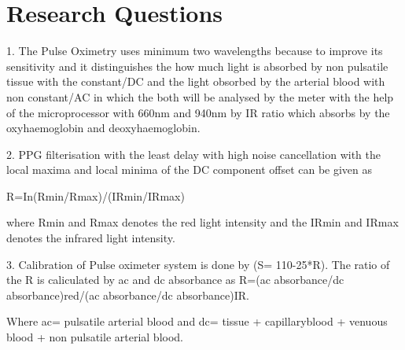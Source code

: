 





\section{Research Questions}

1. The Pulse Oximetry uses minimum two wavelengths because to improve its sensitivity and it distinguishes the how much light is absorbed by non pulsatile tissue with the constant/DC and the light obsorbed by the arterial blood with non constant/AC in which the both will be analysed by the meter with the help of the microprocessor with 660nm and 940nm by IR ratio which absorbs by the oxyhaemoglobin and deoxyhaemoglobin.\cite{webster1997design}

2. PPG filterisation with the least delay with high noise cancellation with the local maxima and local minima of the DC component offset can be given as \cite{1997 websterdesign}
\begin{center}
R=In(Rmin/Rmax)/(IRmin/IRmax)
\end{center}
where Rmin and Rmax denotes the red light intensity and the IRmin and IRmax denotes the infrared light intensity.

3. Calibration of Pulse oximeter system is done by (S= 110-25*R). The ratio of the R is caliculated by ac and dc absorbance as R=(ac absorbance/dc absorbance)red/(ac absorbance/dc absorbance)IR.

Where ac= pulsatile arterial blood and dc= tissue + capillaryblood + venuous blood + non pulsatile arterial blood.



